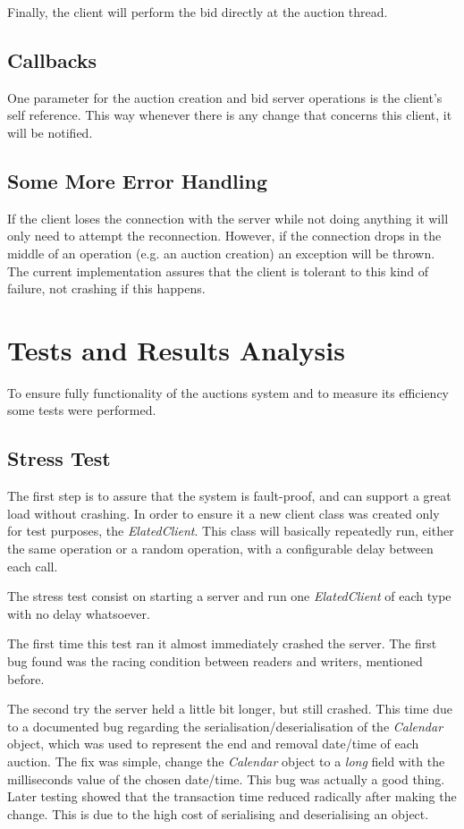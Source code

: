 \documentclass[twocolumn,10pt]{article}
\begin{document}
Finally, the client will perform the bid directly at the auction thread.

\subsection{Callbacks}
One parameter for the auction creation and bid server operations is the client's self reference. This way whenever there is any change that concerns this client, it will be notified.

\subsection{Some More Error Handling}
If the client loses the connection with the server while not doing anything it will only need to attempt the reconnection. However, if the connection drops in the middle of an operation (e.g. an auction creation) an exception will be thrown. The current implementation assures that the client is tolerant to this kind of failure, not crashing if this happens.

\section{Tests and Results Analysis}
To ensure fully functionality of the auctions system and to measure its efficiency some tests were performed.

\subsection{Stress Test}
The first step is to assure that the system is fault-proof, and can support a great load without crashing. In order to ensure it a new client class was created only for test purposes, the \textit{ElatedClient}. This class will basically repeatedly run, either the same operation or a random operation, with a configurable delay between each call.

The stress test consist on starting a server and run one \textit{ElatedClient} of each type with no delay whatsoever.

The first time this test ran it almost immediately crashed the server. The first bug found was the racing condition between readers and writers, mentioned before.

The second try the server held a little bit longer, but still crashed. This time due to a documented bug regarding the serialisation/deserialisation of the \textit{Calendar} object, which was used to represent the end and removal date/time of each auction. The fix was simple, change the \textit{Calendar} object to a \textit{long} field with the milliseconds value of the chosen date/time. This bug was actually a good thing. Later testing showed that the transaction time reduced radically after making the change. This is due to the high cost of serialising and deserialising an object.
\end{document}
